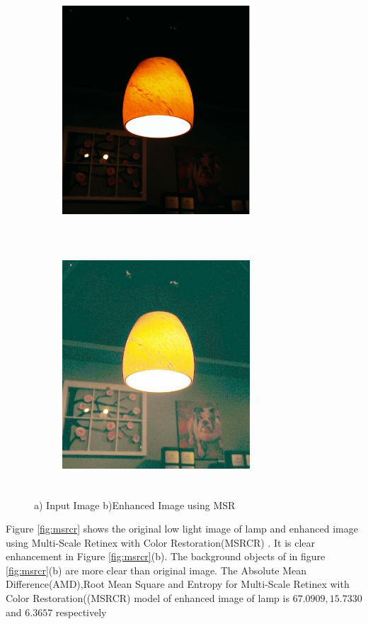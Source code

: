 \begin{figure}
	\begin{subfigure}{8cm}
		\centering    
    	\includegraphics[width=7cm,height=9cm,keepaspectratio]{images/ch5/bulb_input.jpg}
    	\caption{} 
    \end{subfigure}
  	\begin{subfigure}{6cm}
  		\centering
  		\includegraphics[width=7cm,height=9cm,keepaspectratio]{images/ch5/bulb_msr.jpg}
   		\caption{}
  	\end{subfigure}
  	\caption{a) Input Image b)Enhanced Image using MSR}
  	\label{fig:msr}
\end{figure}

Figure \ref{fig:msrcr} shows the original low light image of lamp and enhanced image using Multi-Scale Retinex with Color Restoration(MSRCR) . It is clear enhancement in Figure \ref{fig:msrcr}(b). The background objects of in figure \ref{fig:msrcr}(b) are more clear than original image. The Absolute Mean Difference(AMD),Root Mean Square and Entropy for Multi-Scale Retinex with Color Restoration((MSRCR) model of enhanced image of lamp is $67.0909,15.7330$ and $6.3657$ respectively      

